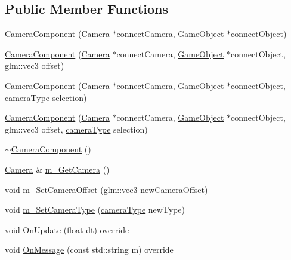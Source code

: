\subsection*{Public Member Functions}
\begin{DoxyCompactItemize}
\item 
\mbox{\hyperlink{class_camera_component_a54997069f98c746e4d6df9e2ce8b5416}{Camera\+Component}} (\mbox{\hyperlink{class_camera}{Camera}} $\ast$connect\+Camera, \mbox{\hyperlink{class_game_object}{Game\+Object}} $\ast$connect\+Object)
\item 
\mbox{\hyperlink{class_camera_component_a638e0e8bf55a52b735f8ab08eb0ad631}{Camera\+Component}} (\mbox{\hyperlink{class_camera}{Camera}} $\ast$connect\+Camera, \mbox{\hyperlink{class_game_object}{Game\+Object}} $\ast$connect\+Object, glm\+::vec3 offset)
\item 
\mbox{\hyperlink{class_camera_component_a05759ae68f3830c8b79314640ad1471c}{Camera\+Component}} (\mbox{\hyperlink{class_camera}{Camera}} $\ast$connect\+Camera, \mbox{\hyperlink{class_game_object}{Game\+Object}} $\ast$connect\+Object, \mbox{\hyperlink{_camera_component_8h_ab07ecb557631c59d8b7ec9c3db110dd5}{camera\+Type}} selection)
\item 
\mbox{\hyperlink{class_camera_component_aab0e46dcfc4a845c7373fe1142d4c981}{Camera\+Component}} (\mbox{\hyperlink{class_camera}{Camera}} $\ast$connect\+Camera, \mbox{\hyperlink{class_game_object}{Game\+Object}} $\ast$connect\+Object, glm\+::vec3 offset, \mbox{\hyperlink{_camera_component_8h_ab07ecb557631c59d8b7ec9c3db110dd5}{camera\+Type}} selection)
\item 
\mbox{\hyperlink{class_camera_component_a977e080c45152719c5e6335cfb0698fc}{$\sim$\+Camera\+Component}} ()
\item 
\mbox{\hyperlink{class_camera}{Camera}} \& \mbox{\hyperlink{class_camera_component_a1fbb5ea1f011ec8ea75688566c8bb545}{m\+\_\+\+Get\+Camera}} ()
\item 
void \mbox{\hyperlink{class_camera_component_a4db1be92619451a81d54269e13232a1f}{m\+\_\+\+Set\+Camera\+Offset}} (glm\+::vec3 new\+Camera\+Offset)
\item 
void \mbox{\hyperlink{class_camera_component_aee0c00e1dbb83fd953b718e278c90603}{m\+\_\+\+Set\+Camera\+Type}} (\mbox{\hyperlink{_camera_component_8h_ab07ecb557631c59d8b7ec9c3db110dd5}{camera\+Type}} new\+Type)
\item 
void \mbox{\hyperlink{class_camera_component_aa0391037fd478ea1a602835ea64091ba}{On\+Update}} (float dt) override
\item 
void \mbox{\hyperlink{class_camera_component_a1cd7e6036568be5bf45d249d8f96a596}{On\+Message}} (const std\+::string m) override
\end{DoxyCompactItemize}
